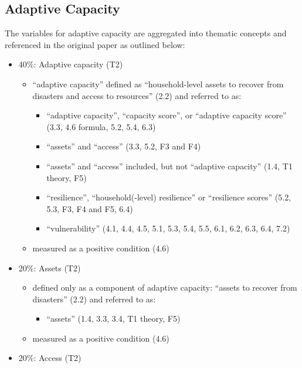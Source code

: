 \documentclass[
]{article}
\providecommand{\tightlist}{%
  \setlength{\itemsep}{0pt}\setlength{\parskip}{0pt}}
\begin{document}
\hypertarget{adaptive-capacity}{%
\subsection{Adaptive Capacity}\label{adaptive-capacity}}

The variables for adaptive capacity are aggregated into thematic
concepts and referenced in the original paper as outlined below:

\begin{itemize}
\tightlist
\item
  40\%: Adaptive capacity (T2)

  \begin{itemize}
  \tightlist
  \item
    ``adaptive capacity'' defined as ``household-level assets to recover
    from disasters and access to resources'' (2.2) and referred to as:

    \begin{itemize}
    \tightlist
    \item
      ``adaptive capacity'', ``capacity score'', or ``adaptive capacity
      score'' (3.3, 4.6 formula, 5.2, 5.4, 6.3)
    \item
      ``assets'' and ``access'' (3.3, 5.2, F3 and F4)
    \item
      ``assets'' and ``access'' included, but not ``adaptive capacity''
      (1.4, T1 theory, F5)
    \item
      ``resilience'', ``household(-level) resilience'' or ``resilience
      scores'' (5.2, 5.3, F3, F4 and F5, 6.4)
    \item
      ``vulnerability'' (4.1, 4.4, 4.5, 5.1, 5.3, 5.4, 5.5, 6.1, 6.2,
      6.3, 6.4, 7.2)
    \end{itemize}
  \item
    measured as a positive condition (4.6)
  \end{itemize}
\item
  20\%: Assets (T2)

  \begin{itemize}
  \tightlist
  \item
    defined only as a component of adaptive capacity: ``assets to
    recover from disasters'' (2.2) and referred to as:

    \begin{itemize}
    \tightlist
    \item
      ``assets'' (1.4, 3.3, 3.4, T1 theory, F5)
    \end{itemize}
  \item
    measured as a positive condition (4.6)
  \end{itemize}
\item
  20\%: Access (T2)


\end{itemize}
\end{document}
